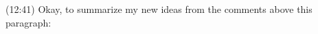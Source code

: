 \documentclass{report}
\begin{document}

(12:41) Okay, to summarize my new ideas from the comments above this paragraph: 
\end{document}
